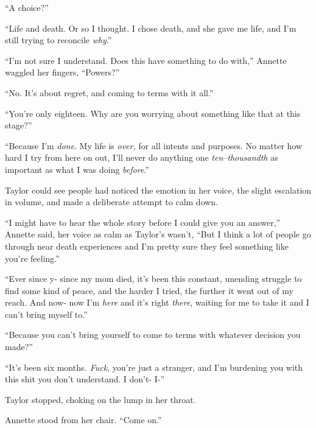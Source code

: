 ``A choice?''



``Life and death.  Or so I thought.  I chose death, and she gave me life, and I'm still trying to reconcile \emph{why}.''



``I'm not sure I understand.  Does this have something to do with,'' Annette waggled her fingers, ``Powers?''



``No.  It's about regret, and coming to terms with it all.''



``You're only eighteen.  Why are you worrying about something like that at this stage?''



``Because I'm \emph{done}.  My life is \emph{over, }for all intents and purposes.  No matter how hard I try from here on out, I'll never do anything one \emph{ten}–\emph{thousandth} as important as what I was doing \emph{before}.''



Taylor could see people had noticed the emotion in her voice, the slight escalation in volume, and made a deliberate attempt to calm down.



``I might have to hear the whole story before I could give you an answer,'' Annette said, her voice as calm as Taylor's wasn't, ``But I think a lot of people go through near death experiences and I'm pretty sure they feel something like you're feeling.''



``Ever since y- since my mom died, it's been this constant, unending struggle to find some kind of peace, and the harder I tried, the further it went out of my reach.  And now- now I'm \emph{here} and it's right \emph{there}, waiting for me to take it and I can't bring myself to.''



``Because you can't bring yourself to come to terms with whatever decision you made?''



``It's been six months\emph{.  Fuck}, you're just a stranger, and I'm burdening you with this shit you don't understand.  I don't- I-''



Taylor stopped, choking on the lump in her throat.



Annette stood from her chair.  ``Come on.''



